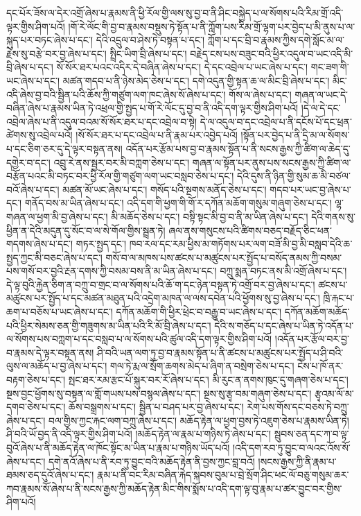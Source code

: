 དང་པོར་ཟོས་ལ་དེར་འགྲོ་ཞེས་པ་རྣམས་ནི་ཕྱི་རོལ་གྱི་ལས་སུ་བྱ་བ་ནི་ཤིང་བསྐྱེད་པ་ལ་སོགས་པའི་རིམ་གྲོ་འདི་ལྟར་གྱིས་ཤིག་པའོ། །གོ་རེ་ལོང་གི་བྱ་བ་རྣམས་བསྡུས་ཏེ་སྟོན་པ་ནི་ཀློག་པས་རིམ་གྲོ་ལྷག་པར་བྱེད་པ་མི་ནུས་པ་ལ་སྐུད་པར་བཏང་ཞེས་པ་དང་། དེའི་འདྲུལ་བ་ཤེས་ཏེ་བསྟན་པ་དང་། ཀློག་པ་དང་བྲི་བ་རྣམས་ཀྱིས་དགེ་སློང་མ་ལ་རྗེས་སུ་བརྩེ་བར་བྱ་ཞེས་པ་དང་། སྤྲིང་ཡིག་བྲི་ཞེས་པ་དང་། བརྗེད་ངས་པས་བཟུང་བའི་ཕྱིར་འདུལ་བ་ཡང་འདི་མི་བྲི་ཞེས་པ་དང་། སོ་སོར་ཐར་པའང་འདིར་དེ་བཞིན་ཞེས་པ་དང་། དེ་དང་འབྲེལ་པ་ཡང་ཞེས་པ་དང་། གང་ཟག་གི་ཡང་ཞེས་པ་དང་། མཚན་གདབ་པ་ནི་ཉེས་མེད་ཅེས་པ་དང་། དགེ་འདུན་གྱི་སྟན་ཆ་ལ་མིང་བྲི་ཞེས་པ་དང་། མིང་འདི་ཞེས་བྱ་བའི་སྦྱིན་པའི་ཆོས་ཀྱི་གཙུག་ལག་ཁང་ཞེས་སོ་ཞེས་པ་དང་། གོས་ལ་ཞེས་པ་དང་། གཞན་ལ་ཡང་དེ་བཞིན་ཞེས་པ་རྣམས་ཡིན་ཏེ་འཕྲལ་གྱི་སྤྱད་པ་གོ་རེ་ལོང་དུ་བྱ་བ་ནི་འདི་དག་ལྟར་གྱིས་ཤིག་པའོ། །དེ་ལ་དེ་དང་འབྲེལ་ཞེས་པ་ནི་འདུལ་བའམ་སོ་སོར་ཐར་པ་དང་འབྲེལ་བ་སྟེ། དེ་ལ་འདུལ་བ་དང་འབྲེལ་པ་ནི་དངོས་པོ་དང་ཕྲན་ཚེགས་སུ་འབྲེལ་པའོ། །སོ་སོར་ཐར་པ་དང་འབྲེལ་པ་ནི་རྣམ་པར་འབྱེད་པའོ། །སྟོན་པར་བྱེད་པ་ནི་དྲི་མ་ལ་སོགས་པ་དང་ཅིག་ཅར་དུ་དེ་ལྟར་བསྟན་ནས། འདོན་པར་རྩོམ་པས་བྱ་བ་རྣམས་སྟོན་པ་ནི་སངས་རྒྱས་ཀྱི་ཚིག་ལ་ཆེད་དུ་དགྱེར་བ་དང་། འབྲུ་རེ་ནས་སྦྱར་བར་མི་བཀླག་ཅེས་པ་དང་། གཞན་ལ་སྟོན་པར་ནུས་པས་སངས་རྒྱས་ཀྱི་ཚིག་ལ་བརྩོན་པའང་མི་བཏང་བར་ཕྱི་རོལ་གྱི་གཙུག་ལག་ཡང་བསླབ་ཅེས་པ་དང་། དེའི་དུས་ནི་ཉིན་གྱི་སུམ་ཆ་མི་བཙལ་བའོ་ཞེས་པ་དང་། མཚན་མོ་ཡང་ཞེས་པ་དང་། གསོད་པའི་སྔགས་མནོད་ཅེས་པ་དང་། གདབ་པར་ཡང་བྱ་ཞེས་པ་དང་། གནོད་བས་མ་ཡིན་ཞེས་པ་དང་། འདི་དག་གི་ཕྱག་གི་གོ་ར་དཀོན་མཆོག་གསུམ་གཞུག་ཅེས་པ་དང་། ལྷ་གཞན་ལ་ཕྱག་མི་བྱ་ཞེས་པ་དང་། མི་མཆོད་ཅེས་པ་དང་། བསྟི་སྟང་མི་བྱ་བ་ནི་མ་ཡིན་ཞེས་པ་དང་། དེའི་གནས་སུ་ཕྱིན་ན་དེའི་མདུན་དུ་སོང་བ་ལ་སེ་གོལ་གྱིས་སྦྲན་ཏེ། ཞལ་ནས་གསུངས་པའི་ཚིགས་བཅད་བརྗོད་ཅིང་ཕན་གདགས་ཞེས་པ་དང་། གཏར་སྤྱད་དང་། ཁབ་རལ་དང་རམ་ཕྱིས་མ་གཏོགས་པར་ལག་བཟོ་མི་བྱ་མི་བསླབ་དེའི་ཆ་སྤྱད་ཀྱང་མི་བཅང་ཞེས་པ་དང་། གསོ་བ་ལ་མཁས་པས་ཚངས་པ་མཚུངས་པར་སྤྱོད་པ་བསོད་ནམས་ཀྱི་བསམ་པས་གསོ་བར་བྱའི་རྔན་དགས་ཀྱི་བསམ་བས་ནི་མ་ཡིན་ཞེས་པ་དང་། བཀྲུ་སྨན་བཏང་ནས་མི་འགྲོ་ཞེས་པ་དང་། དེ་ལྟ་བུའི་རྐྱེན་ཅིག་ན་བཀྲུ་བ་གྲང་བ་ལ་སོགས་པའི་ཆོ་ག་དང་ཉེན་བསྟན་ཏེ་འགྲོ་བར་བྱ་ཞེས་པ་དང་། ཚངས་པ་མཚུངས་པར་སྤྱོད་པ་དང་མཚན་མཐུན་པའི་འདྲེག་མཁན་ལ་ལས་དབེན་པའི་ཕྱོགས་སུ་བྱ་ཞེས་པ་དང་། ཁྲི་རྐང་པ་ཆག་པ་བཅོས་པ་ཡང་ཞེས་པ་དང་། དཀོན་མཆོག་གི་ཕྱིར་ཕྲེང་བ་བརྒྱུ་བ་ཡང་ཞེས་པ་དང་། དཀོན་མཆོག་མཆོད་པའི་ཕྱིར་སེམས་ཅན་གྱི་གཟུགས་མ་ཡིན་པའི་རི་མོ་བྲི་ཞེས་པ་དང་། དེའི་ས་གཅོད་པ་དང་ཞེས་པ་ཡིན་ཏེ་འདོན་པ་ལ་སོགས་པས་བཀླག་པ་དང་བསླབ་པ་ལ་སོགས་པའི་ཚུལ་འདི་དག་ལྟར་གྱིས་ཤིག་པའོ། །འདོན་པར་རྩོལ་བར་བྱ་བ་རྣམས་དེ་ལྟར་བསྟན་ནས། ཤི་བའི་ཡན་ལག་ཏུ་བྱ་བ་རྣམས་སྟོན་པ་ནི་ཚངས་པ་མཚུངས་པར་སྤྱོད་པ་ཤི་བའི་ལུས་ལ་མཆོད་པ་བྱ་ཞེས་པ་དང་། གལ་ཏེ་རྨ་ལ་སྲོག་ཆགས་མེད་པ་ཞིག་ན་བསྲེག་ཅེས་པ་དང་། ངེས་པ་ཁོ་ནར་བརྟག་ཅེས་པ་དང་། སྤང་ཐར་རམ་རྩང་པོ་སྐུར་བར་རོ་ཞེས་པ་དང་། མི་རུང་ན་ནགས་ཁུང་དུ་གཞག་ཅེས་པ་དང་། སྔས་བྱང་ཕྱོགས་སུ་བསྟན་ལ་གློ་གཡས་པས་བསྙལ་ཞེས་པ་དང་། སྔས་སུ་རྩྭ་བམ་གཞུག་ཅེས་པ་དང་། རྩྭའམ་ལོ་མ་དགབ་ཅེས་པ་དང་། ཆོས་བསྒྲགས་པ་དང་། སྦྱིན་པ་བཤད་པར་བྱ་ཞེས་པ་དང་། རེག་པས་གོས་དང་བཅས་ཏེ་བཀྲུ་ཞེས་པ་དང་། བལ་གྱིས་ཀྱང་རྐང་ལག་བཀྲུ་ཞེས་པ་དང་། མཆོད་རྟེན་ལ་ཕྱག་བྱས་ཏེ་འཇུག་ཅེས་པ་རྣམས་ཡིན་ཏེ། ཤི་བའི་ཡོ་བྱད་ནི་འདི་ལྟར་གྱིས་ཤིག་པའོ། །མཆོད་རྟེན་ལ་རྣམ་པ་གཉིས་ཏེ་ཞེས་པ་དང་། སྦུབས་ཅན་དང་ཀ་བ་ལྟ་བུའོ་ཞེས་པ་ནི་མཆོད་རྟེན་ལ་ཁོང་སྟོང་མ་ཡིན་པ་རྣམ་པ་གཉིས་ཡོད་པའོ། །འདི་དག་རབ་ཏུ་བྱུང་བ་ལའང་འོས་སོ་ཞེས་པ་དང་། དགེ་ནའོ་ཞེས་པ་ནི་རབ་ཏུ་བྱུང་བའི་མཆོད་རྟེན་ནི་བྱས་ཀྱང་བླ་བའོ། །སངས་རྒྱས་ཀྱི་ནི་རྣམ་པ་ཐམས་ཅད་དུའོ་ཞེས་པ་དང་། རྣམ་པ་ནི་བང་རིམ་བཞིན་རྐེད་སྐབས་བུམ་པ་བྲེ་སྲོག་ཤིང་ཕང་ལོ་བཅུ་གསུམ་ཆར་ཀབ་རྣམས་སོ་ཞེས་པ་ནི་སངས་རྒྱས་ཀྱི་མཆོད་རྟེན་མིང་གིས་སྨོས་པ་འདི་དག་ལྟ་བུ་རྣམ་པ་ཚར་བྱུང་བར་གྱིས་ཤིག་པའོ། 